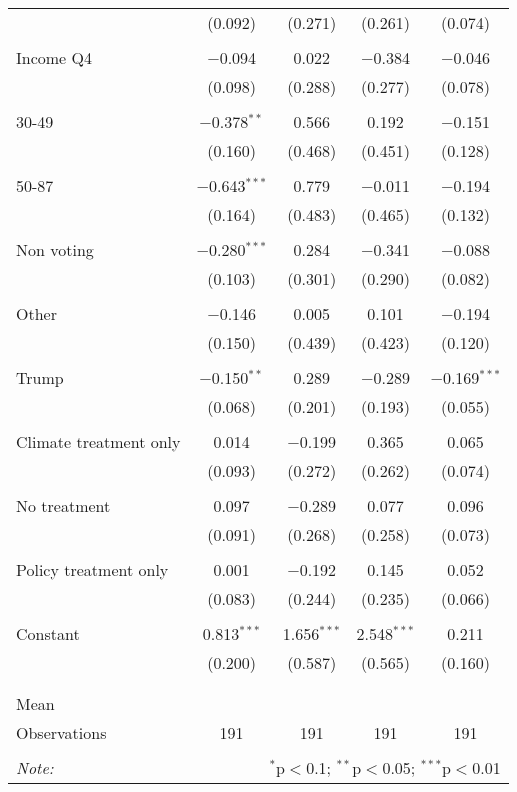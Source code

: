 \begin{tabular}{@{\extracolsep{5pt}}lcccc}
  & (0.092) & (0.271) & (0.261) & (0.074) \\ 
  & & & & \\ 
 Income Q4 & $-$0.094 & 0.022 & $-$0.384 & $-$0.046 \\ 
  & (0.098) & (0.288) & (0.277) & (0.078) \\ 
  & & & & \\ 
 30-49 & $-$0.378$^{**}$ & 0.566 & 0.192 & $-$0.151 \\ 
  & (0.160) & (0.468) & (0.451) & (0.128) \\ 
  & & & & \\ 
 50-87 & $-$0.643$^{***}$ & 0.779 & $-$0.011 & $-$0.194 \\ 
  & (0.164) & (0.483) & (0.465) & (0.132) \\ 
  & & & & \\ 
 Non voting & $-$0.280$^{***}$ & 0.284 & $-$0.341 & $-$0.088 \\ 
  & (0.103) & (0.301) & (0.290) & (0.082) \\ 
  & & & & \\ 
 Other & $-$0.146 & 0.005 & 0.101 & $-$0.194 \\ 
  & (0.150) & (0.439) & (0.423) & (0.120) \\ 
  & & & & \\ 
 Trump & $-$0.150$^{**}$ & 0.289 & $-$0.289 & $-$0.169$^{***}$ \\ 
  & (0.068) & (0.201) & (0.193) & (0.055) \\ 
  & & & & \\ 
 Climate treatment only & 0.014 & $-$0.199 & 0.365 & 0.065 \\ 
  & (0.093) & (0.272) & (0.262) & (0.074) \\ 
  & & & & \\ 
 No treatment & 0.097 & $-$0.289 & 0.077 & 0.096 \\ 
  & (0.091) & (0.268) & (0.258) & (0.073) \\ 
  & & & & \\ 
 Policy treatment only & 0.001 & $-$0.192 & 0.145 & 0.052 \\ 
  & (0.083) & (0.244) & (0.235) & (0.066) \\ 
  & & & & \\ 
 Constant & 0.813$^{***}$ & 1.656$^{***}$ & 2.548$^{***}$ & 0.211 \\ 
  & (0.200) & (0.587) & (0.565) & (0.160) \\ 
  & & & & \\ 
\hline \\[-1.8ex] 
Mean &  &  &  &  \\ 
Observations & 191 & 191 & 191 & 191 \\ 
\hline 
\hline \\[-1.8ex] 
\textit{Note:}  & \multicolumn{4}{r}{$^{*}$p$<$0.1; $^{**}$p$<$0.05; $^{***}$p$<$0.01} \\ 
\end{tabular} 
